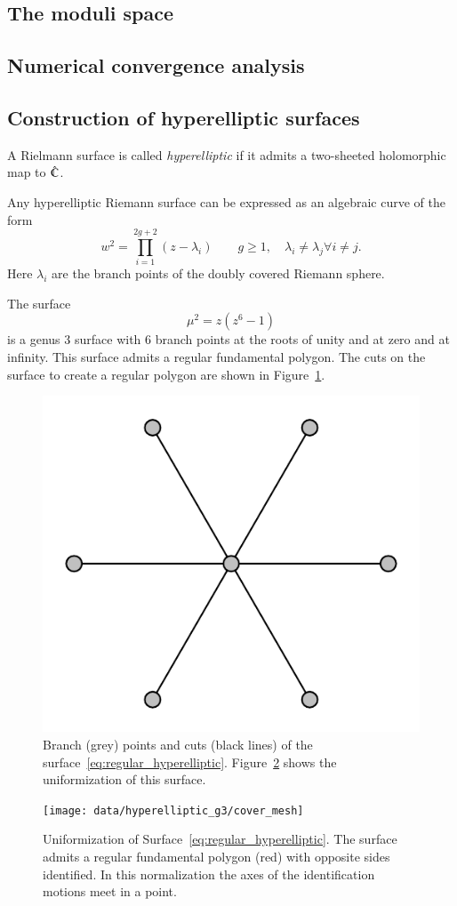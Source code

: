 \documentclass[Thesis.tex]{subfiles}
\begin{document}
\subsection{The moduli space}
\subsection{Numerical convergence analysis}

\subsection{Construction of hyperelliptic surfaces}

\begin{definition}
	A Rielmann surface is called \emph{hyperelliptic} if it admits a two-sheeted holomorphic map to
$\hat{\mathbb C}$.
\end{definition}

Any hyperelliptic Riemann surface can be expressed as an algebraic curve of the form
\[ w^2 = \prod_{i=1}^{2g+2}(z-\lambda_i) \quad\quad g\geq1,\quad \lambda_i\neq \lambda_j \forall i\neq j.\]
Here $\lambda_i$ are the branch points of the doubly covered Riemann sphere.

\begin{example}
The surface 
\begin{equation}
	\label{eq:regular_hyperelliptic}
	\mu^2=z(z^6-1)
\end{equation} 
is a genus $3$ surface with $6$ branch points at the 
roots of unity and at zero and at infinity. This surface admits a regular fundamental polygon.
The cuts on the surface to create a regular polygon are shown in Figure~\ref{fig:regular_branchdata}.
\end{example}

\begin{figure}
\centering
\includegraphics[width=0.2\linewidth]{data/hyperelliptic_g3/curve}
\caption{Branch (grey) points and cuts (black lines) of the surface~\ref{eq:regular_hyperelliptic}.
Figure~\ref{fig:regular_cover} shows the uniformization of this surface.}
\label{fig:regular_branchdata}
\end{figure}

\begin{figure}
\centering
\texttt{[image: data/hyperelliptic\_g3/cover\_mesh]}
\caption{Uniformization of Surface~\ref{eq:regular_hyperelliptic}. The surface admits
a regular fundamental polygon (red) with opposite sides identified. In this normalization
the axes of the identification motions meet in a point.}
\label{fig:regular_cover}
\end{figure}
\end{document}
